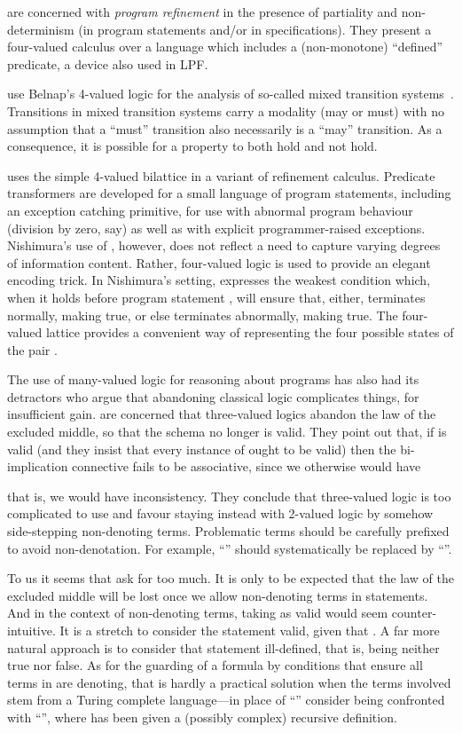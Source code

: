 \documentclass{tlp}
\begin{document}
 are concerned with 
\emph{program refinement}
in the presence of partiality and non-determinism 
(in program statements and/or in specifications).
They present a four-valued calculus over a language which includes
a (non-monotone) ``defined'' predicate, a device also used in LPF.

 use Belnap's 4-valued logic for the
analysis of so-called mixed transition systems~\cite{Dams-Toplas:1997}.
Transitions in mixed transition systems carry a modality (may or must)
with no assumption that a ``must'' transition also necessarily is a
``may'' transition.
As a consequence, it is possible for a property to both hold and not
hold.

 uses the simple 4-valued bilattice
 in a variant of refinement calculus.
Predicate transformers are developed for a small language of
program statements, including an exception catching primitive,
for use with abnormal program behaviour (division by zero, say)
as well as with explicit programmer-raised exceptions.
Nishimura's use of , however,
does not reflect a need to capture
varying degrees of information content.
Rather, four-valued logic is used to provide an elegant encoding trick.
In Nishimura's setting,  expresses the
weakest condition which, when it holds before program statement ,
will ensure that, either,  terminates normally, making  true,
or else  terminates abnormally, making  true.
The four-valued lattice provides a convenient way of representing the
four possible states of the pair .

The use of many-valued logic for reasoning about programs has also
had its detractors who argue that abandoning classical logic
complicates things, for insufficient gain.
 are concerned that
three-valued logics abandon the law of the excluded middle,
so that the schema  no longer is valid.
They point out that, if  is valid
(and they insist that every instance of 
ought to be valid)
then the bi-implication connective 
fails to be associative, since we otherwise would have

that is, we would have inconsistency.
They conclude that three-valued logic is too complicated to use
and favour staying instead with 2-valued logic by somehow side-stepping
non-denoting terms.
Problematic terms should be carefully prefixed to avoid non-denotation. 
For example,
``'' should systematically be replaced by
``''.

To us it seems that  ask for too much.
It is only to be expected that the law of the excluded middle will
be lost once we allow non-denoting terms in statements. 
And in the context of non-denoting terms, taking 
 as valid would seem counter-intuitive.
It is a stretch to consider the statement 
 valid,
given that .
A far more natural approach is to consider that statement
ill-defined, that is, being neither true nor false.
As for the guarding of a formula  by conditions that ensure 
all terms in  are denoting,
that is hardly a practical solution when the terms involved stem 
from a Turing complete language---in place of ``'' 
consider being confronted with ``'',
where  has been given a (possibly complex) recursive definition.
\end{document}
